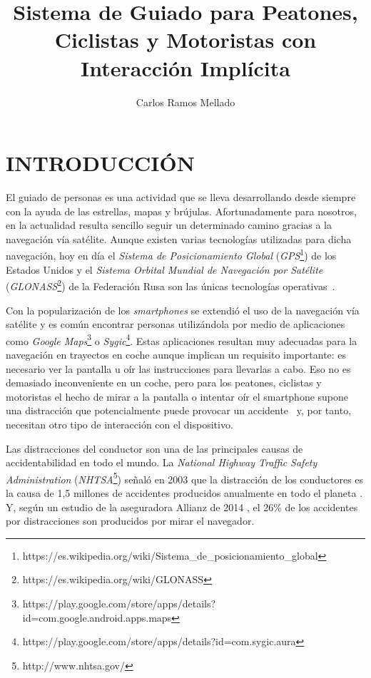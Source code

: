 \documentclass{pre-tfg}
\title{Sistema de Guiado para Peatones, Ciclistas y Motoristas con Interacción Implícita}
\author{Carlos Ramos Mellado}
\begin{document}
\maketitle
\tableofcontents

\newpage

\section{INTRODUCCIÓN}

El guiado de personas es una actividad que se lleva desarrollando desde siempre con la
ayuda de las estrellas, mapas y brújulas. Afortunadamente para nosotros, en la actualidad
resulta sencillo seguir un determinado camino gracias a la navegación vía satélite. Aunque
existen varias tecnologías utilizadas para dicha navegación, hoy en día el \textit{Sistema
  de Posicionamiento Global}
(\textit{GPS}\footnote{https://es.wikipedia.org/wiki/Sistema\_de\_posicionamiento\_global})
de los Estados Unidos y el \textit{Sistema Orbital Mundial de Navegación por Satélite}
(\textit{GLONASS}\footnote{https://es.wikipedia.org/wiki/GLONASS}) de la Federación Rusa
son las únicas tecnologías operativas~\cite{SPSA}.

Con la popularización de los \emph{smartphones} se extendió el uso de la navegación vía
satélite y es común encontrar personas utilizándola por medio de aplicaciones como
\textit{Google
  Maps}\footnote{https://play.google.com/store/apps/details?id=com.google.android.apps.maps}
o
\textit{Sygic}\footnote{https://play.google.com/store/apps/details?id=com.sygic.aura}. Estas
aplicaciones resultan muy adecuadas para la navegación en trayectos en coche aunque
implican un requisito importante: es necesario ver la pantalla u oír las instrucciones
para llevarlas a cabo. Eso no es demasiado inconveniente en un coche, pero para los peatones,
ciclistas y motoristas el hecho de mirar a la pantalla o intentar oír el smartphone supone
una distracción que potencialmente puede provocar un accidente~\cite{Valcarcel12} y, por
tanto, necesitan otro tipo de interacción con el dispositivo.

Las distracciones del conductor son una de las principales causas de accidentabilidad en todo el
mundo. La \textit{National Highway Traffic Safety Administration}
(\textit{NHTSA}\footnote{http://www.nhtsa.gov/}) señaló en 2003 que la distracción de los
conductores es la causa de 1,5 millones de accidentes producidos anualmente en todo el planeta
\cite{RACC03}. Y, según un estudio de la aseguradora Allianz de 2014 \cite{Allianz14}, el 26\% de
los accidentes por distracciones son producidos por mirar el navegador.
\end{document}
